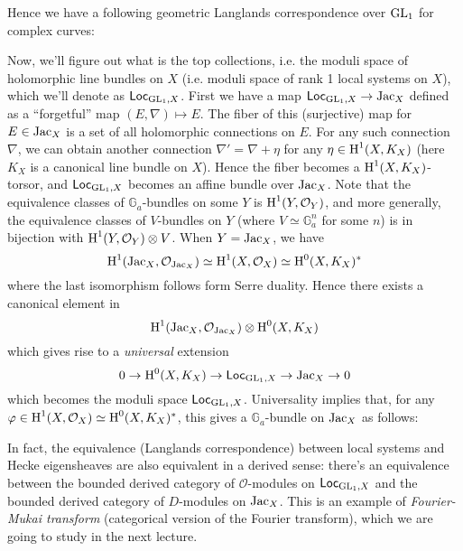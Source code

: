 Hence we have a following geometric Langlands correspondence over $\operatorname{\mathrm{GL}}_1$ for complex curves:
\begin{center}
\end{center}
Now, we'll figure out what is the top collections, i.e. the moduli space of holomorphic line bundles on $X$
(i.e. moduli space of rank 1 local systems on $X$), which we'll denote as $\mathsf{Loc}_{\operatorname{\mathrm{GL}}_1, X}$.
First we have a map $\mathsf{Loc}_{\operatorname{\mathrm{GL}}_1, X} \to \operatorname{\mathrm{Jac}}_X$ defined as a ``forgetful'' map $(E, \nabla) \mapsto E$.
The fiber of this (surjective) map for $E \in \operatorname{\mathrm{Jac}}_X$ is a set of all holomorphic connections on $E$.
For any such connection $\nabla$, we can obtain another connection $\nabla' = \nabla + \eta$ for any $\eta \in \operatorname{\mathrm{H}}^1(X, K_X)$ 
(here $K_X$ is a canonical line bundle on $X$).
Hence the fiber becomes a $\operatorname{\mathrm{H}}^{1}(X, K_X)$-torsor, and $\mathsf{Loc}_{\operatorname{\mathrm{GL}}_1, X}$ becomes an affine bundle over $\operatorname{\mathrm{Jac}}_X$.
Note that the equivalence classes of $\mathbb{G}_a$-bundles on some $Y$ is $\operatorname{\mathrm{H}}^{1}(Y, \mathcal{O}_Y)$, 
and more generally, the equivalence classes of $V$-bundles on $Y$ (where $V \simeq \mathbb{G}_{a}^{n}$ for some $n$) is in bijection with
$\operatorname{\mathrm{H}}^{1}(Y, \mathcal{O}_Y) \otimes V$.
When $Y = \operatorname{\mathrm{Jac}}_X$, we have
$$
\operatorname{\mathrm{H}}^{1}(\operatorname{\mathrm{Jac}}_X, \mathcal{O}_{\operatorname{\mathrm{Jac}}_X}) \simeq \operatorname{\mathrm{H}}^{1}(X, \mathcal{O}_X) \simeq \operatorname{\mathrm{H}}^{0}(X, K_X)^{*}
$$
where the last isomorphism follows form Serre duality. Hence there exists a canonical element in 
$$
\operatorname{\mathrm{H}}^{1}(\operatorname{\mathrm{Jac}}_X, \mathcal{O}_{\operatorname{\mathrm{Jac}}_X}) \otimes \operatorname{\mathrm{H}}^{0}(X, K_X)
$$
which gives rise to a \emph{universal} extension
$$
0 \to \operatorname{\mathrm{H}}^{0}(X, K_X) \to \mathsf{Loc}_{\operatorname{\mathrm{GL}}_1, X} \to \operatorname{\mathrm{Jac}}_X \to 0
$$
which becomes the moduli space $\mathsf{Loc}_{\operatorname{\mathrm{GL}}_1, X}$.
Universality implies that, for any $\varphi \in \operatorname{\mathrm{H}}^{1}(X, \mathcal{O}_X) \simeq \operatorname{\mathrm{H}}^{0}(X, K_X)^{*}$, 
this gives a $\mathbb{G}_a$-bundle on $\operatorname{\mathrm{Jac}}_X$ as follows:
\begin{center}
\end{center}

In fact, the equivalence (Langlands correspondence) between local systems and Hecke eigensheaves are also equivalent
in a derived sense: there's an equivalence between the bounded derived category of $\mathcal{O}$-modules on $\mathsf{Loc}_{\operatorname{\mathrm{GL}}_1, X}$
and the bounded derived category of $D$-modules on $\operatorname{\mathrm{Jac}}_X$.
This is an example of \emph{Fourier-Mukai transform} (categorical version of the Fourier transform), which we are going to study in the next lecture.